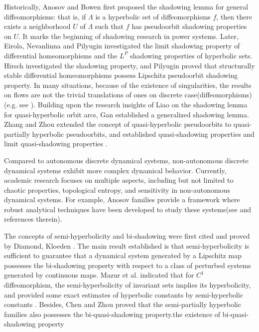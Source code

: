 \documentclass[12pt]{article}
\begin{document}
Historically, Anosov\cite{DA} and Bowen\cite{RB} first proposed the shadowing lemma for general diffeomorphisms: that is, if $ \Lambda $ is a hyperbolic set of diffeomorphisms $ f $, then there exists a neighborhood $ U $ of $ \Lambda $ such that $ f $ has pseudoorbit shadowing properties on $ U $. It marks the beginning of shadowing research in power systems. Later, Eirola, Nevanlinna and Pilyugin investigated the limit shadowing property of differential homeomorphisms and the $ L^{P} $ shadowing properties of hyperbolic sets\cite{TO}. Hirsch investigated the shadowing property\cite{MH}, and Pilyugin proved that structurally stable differential homeomorphisms possess Lipschitz pseudoorbit shadowing property\cite{SP}. In many situations, because of the existence of singularities, the results on flows are not the trivial translations of ones on discrete case(diffeomorphisms) (e.g. see \cite{SG,SD}). Building upon the research insights of Liao \cite{LS} on the shadowing lemma for quasi-hyperbolic orbit arcs,  Gan established a generalized shadowing lemma\cite{SG}. Zhang and Zhou extended the concept of quasi-hyperbolic pseudoorbits to quasi-partially hyperbolic pseudoorbits, and established quasi-shadowing properties and limit quasi-shadowing properties \cite{ZF}. 

Compared to autonomous discrete dynamical systems, non-autonomous discrete dynamical systems exhibit more complex dynamical behavior. Currently, academic research focuses on multiple aspects, including but not limited to chaotic properties, topological entropy, and sensitivity in non-autonomous dynamical systems. For example, Anosov families
provide a framework where robust analytical techniques have been developed to study these systems(see \cite{LB,JM,WC} and references therein).

The concepts of semi-hyperbolicity and bi-shadowing were first cited and proved by Diamond, Kloeden \cite{PD1,PD2,PD3}. The main result established is that semi-hyperbolicity is sufficient to guarantee that a dynamical system generated by a Lipschitz map possesses the bi-shadowing property with respect to a class of perturbed systems generated by continuous maps. Mazur et al. indicated that for $ C^{1} $
diffeomorphism, the semi-hyperbolicity of invariant sets implies its hyperbolicity, and provided some exact estimates of hyperbolic constants by semi-hyperbolic constants \cite{MM}.
Besides, Chen and Zhou proved that the semi-partially hyperbolic families also possesses the bi-quasi-shadowing property.the existence of bi-quasi-shadowing property\cite{LC}
\end{document}
